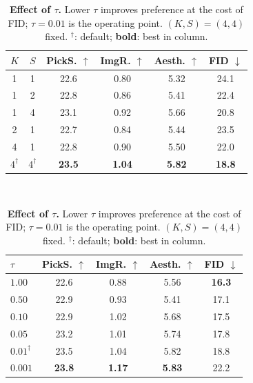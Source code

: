 \begin{table}[h]

\centering
\small
\begin{minipage}[t]{0.44\linewidth}
\centering
\setlength{\tabcolsep}{4pt}
\caption{\textbf{Effect of $(K,S)$.} Both axes contribute independently; $(K,S){=}(4,4)$ is best. $^\dagger$: default; \textbf{bold}: best in column.}
\begin{tabular}{cccccc}
\toprule
$K$ & $S$ & \textbf{PickS.} $\uparrow$ & \textbf{ImgR.} $\uparrow$ & \textbf{Aesth.} $\uparrow$ & \textbf{FID} $\downarrow$ \\
\midrule
1          & 1          & 22.6 & 0.80 & 5.32 & 24.1 \\
1          & 2          & 22.8 & 0.86 & 5.41 & 22.4 \\
1          & 4          & 23.1 & 0.92 & 5.66 & 20.8 \\
2          & 1          & 22.7 & 0.84 & 5.44 & 23.5 \\
4          & 1          & 22.8 & 0.90 & 5.50 & 22.0 \\
$4^\dagger$ & $4^\dagger$ & \textbf{23.5} & \textbf{1.04} & \textbf{5.82} & \textbf{18.8} \\
\bottomrule
\end{tabular}
\label{tab:ablation_ks}
\end{minipage}\ \
\hfill
\begin{minipage}[t]{0.53\linewidth}
\centering
\setlength{\tabcolsep}{5pt}
\caption{\textbf{Effect of $\tau$.} Lower $\tau$ improves preference at the cost of FID; $\tau{=}0.01$ is the operating point. $(K,S){=}(4,4)$ fixed. $^\dagger$: default; \textbf{bold}: best in column.}
\begin{tabular}{lcccc}
\toprule
$\tau$ & \textbf{PickS.} $\uparrow$ & \textbf{ImgR.} $\uparrow$ & \textbf{Aesth.} $\uparrow$ & \textbf{FID} $\downarrow$ \\
\midrule
$1.00$             & 22.6          & 0.88          & 5.56          & \textbf{16.3} \\
$0.50$             & 22.9          & 0.93          & 5.41          & 17.1 \\
$0.10$             & 22.9          & 1.02          & 5.68          & 17.5 \\
$0.05$             & 23.2          & 1.01          & 5.74          & 17.8 \\
$0.01^\dagger$     & 23.5          & 1.04          & 5.82          & 18.8 \\
$0.001$            & \textbf{23.8} & \textbf{1.17} & \textbf{5.83} & 22.2 \\
\bottomrule
\end{tabular}
\label{tab:ablation_tau}
\end{minipage}

\end{table}
